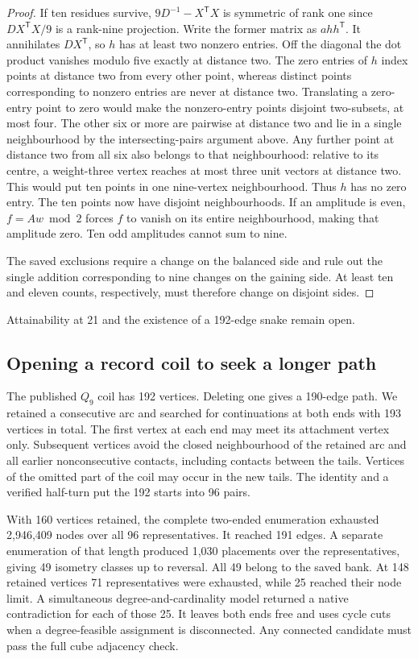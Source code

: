 \documentclass[11pt,a4paper]{article}
\theoremstyle{definition}
\theoremstyle{remark}
\begin{document}
\begin{proof}
If ten residues survive, $9D^{-1}-X^{\mathsf T}X$ is symmetric of
rank one since $DX^{\mathsf T}X/9$ is a rank-nine projection.
Write the former matrix as $a h h^{\mathsf T}$. It annihilates
$DX^{\mathsf T}$, so $h$ has at least two nonzero entries.
Off the diagonal the dot product vanishes modulo five exactly at
distance two. The zero entries of $h$ index points at distance
two from every other point, whereas distinct points corresponding
to nonzero entries are never at distance two. Translating a zero-entry
point to zero would make the nonzero-entry points disjoint two-subsets,
at most four. The other six or more are pairwise at distance two and
lie in a single neighbourhood by the intersecting-pairs argument above.
Any further point at distance two from all six also belongs to that
neighbourhood: relative to its centre, a weight-three vertex reaches
at most three unit vectors at distance two. This would put ten points
in one nine-vertex neighbourhood. Thus $h$ has no zero entry. The ten
points now have disjoint neighbourhoods. If an amplitude is even,
$f=Aw\bmod2$ forces $f$ to vanish on its entire neighbourhood, making
that amplitude zero. Ten odd amplitudes cannot sum to nine.

The saved exclusions require a change on the balanced side and rule
out the single addition corresponding to nine changes on the gaining
side. At least ten and eleven counts, respectively, must therefore
change on disjoint sides.
\end{proof}
Attainability at 21 and the existence of a 192-edge snake remain open.

\subsection{Opening a record coil to seek a longer path}
\label{sec:coilopening243}
The published $Q_9$ coil has 192 vertices. Deleting one gives a
190-edge path. We retained a consecutive arc and searched for
continuations at both ends with 193 vertices in total. The first
vertex at each end may meet its attachment vertex only. Subsequent
vertices avoid the closed neighbourhood of the retained arc and all
earlier nonconsecutive contacts, including contacts between the tails.
Vertices of the omitted part of the coil may occur in the new tails.
The identity and a verified half-turn put the 192 starts into 96 pairs.

With 160 vertices retained, the complete two-ended enumeration
exhausted 2,946,409 nodes over all 96 representatives. It reached
191 edges. A separate enumeration of that length produced 1,030
placements over the representatives, giving 49 isometry classes up to
reversal. All 49 belong to the saved bank. At 148 retained vertices
71 representatives were exhausted, while 25 reached their node limit.
A simultaneous degree-and-cardinality model returned a native
contradiction for each of those 25. It leaves both ends free and
uses cycle cuts when a degree-feasible assignment is disconnected.
Any connected candidate must pass the full cube adjacency check.
\end{document}
